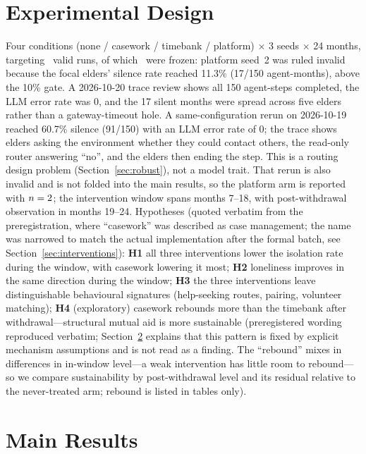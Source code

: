 \documentclass[10pt,twocolumn]{article}
\begin{document}
\section{Experimental Design}
Four conditions (none / casework / timebank / platform) $\times$ 3 seeds $\times$ 24 months, targeting \TargetRuns\ valid runs, of which \ValidRuns\ were frozen: platform seed~2 was ruled invalid because the focal elders' silence rate reached 11.3\% (17/150 agent-months), above the 10\% gate. A 2026-10-20 trace review shows all 150 agent-steps completed, the LLM error rate was 0, and the 17 silent months were spread across five elders rather than a gateway-timeout hole. A same-configuration rerun on 2026-10-19 reached 60.7\% silence (91/150) with an LLM error rate of 0; the trace shows elders asking the environment whether they could contact others, the read-only router answering ``no'', and the elders then ending the step. This is a routing design problem (Section~\ref{sec:robust}), not a model trait. That rerun is also invalid and is not folded into the main results, so the platform arm is reported with $n=2$; the intervention window spans months 7--18, with post-withdrawal observation in months 19--24. Hypotheses (quoted verbatim from the preregistration, where ``casework'' was described as case management; the name was narrowed to match the actual implementation after the formal batch, see Section~\ref{sec:interventions}):
\textbf{H1} all three interventions lower the isolation rate during the window, with casework lowering it most;
\textbf{H2} loneliness improves in the same direction during the window;
\textbf{H3} the three interventions leave distinguishable behavioural signatures (help-seeking routes, pairing, volunteer matching);
\textbf{H4} (exploratory) casework rebounds more than the timebank after withdrawal---structural mutual aid is more sustainable (preregistered wording reproduced verbatim; Section~\ref{sec:results} explains that this pattern is fixed by explicit mechanism assumptions and is not read as a finding. The ``rebound'' mixes in differences in in-window level---a weak intervention has little room to rebound---so we compare sustainability by post-withdrawal level and its residual relative to the never-treated arm; rebound is listed in tables only).

\section{Main Results}\label{sec:results}
\DraftBadgeEn
\end{document}
